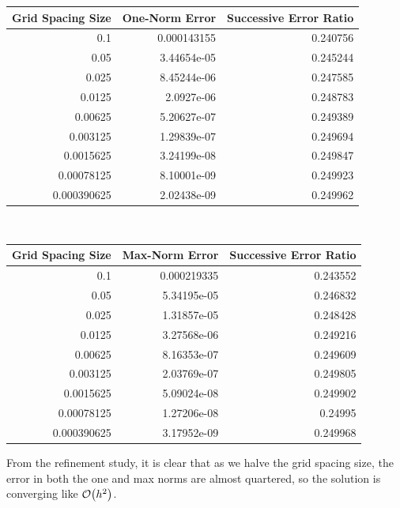\documentclass[12pt]{article}
\begin{document}
\begin{center}
\begin{tabular}{rrr}
\hline
Grid Spacing Size &  One-Norm Error & Successive Error Ratio \\
\hline
 0.1         & 0.000143155 & 0.240756 \\
 0.05        & 3.44654e-05 & 0.245244 \\
 0.025       & 8.45244e-06 & 0.247585 \\
 0.0125      & 2.0927e-06  & 0.248783 \\
 0.00625     & 5.20627e-07 & 0.249389 \\
 0.003125    & 1.29839e-07 & 0.249694 \\
 0.0015625   & 3.24199e-08 & 0.249847 \\
 0.00078125  & 8.10001e-09 & 0.249923 \\
 0.000390625 & 2.02438e-09 & 0.249962 \\
\hline
\end{tabular}\\
\begin{tabular}{rrr}
\hline
Grid Spacing Size &  Max-Norm Error & Successive Error Ratio \\
\hline
 0.1         & 0.000219335 & 0.243552 \\
 0.05        & 5.34195e-05 & 0.246832 \\
 0.025       & 1.31857e-05 & 0.248428 \\
 0.0125      & 3.27568e-06 & 0.249216 \\
 0.00625     & 8.16353e-07 & 0.249609 \\
 0.003125    & 2.03769e-07 & 0.249805 \\
 0.0015625   & 5.09024e-08 & 0.249902 \\
 0.00078125  & 1.27206e-08 & 0.24995  \\
 0.000390625 & 3.17952e-09 & 0.249968 \\
\hline
\end{tabular}
\end{center}


From the refinement study, it is clear that as we halve the grid spacing size, the error in both the one and max norms are almost quartered, so the solution is converging like $\order{h^2}$.\\
\end{document}
